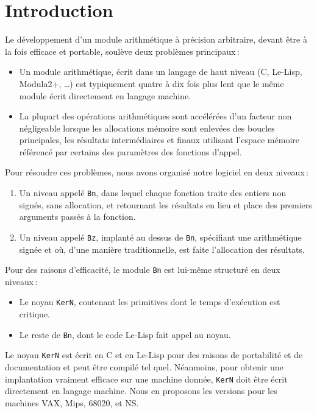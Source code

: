 \section{Introduction}
Le d\'eveloppement d'un module arithm\'etique \`a pr\'ecision arbitraire,
devant \^etre \`a la fois efficace et portable, soul\`eve deux probl\`emes
principaux\,:
\begin{itemize}
  \item Un module arithm\'etique, \'ecrit dans un langage de haut niveau
    (C, Le-Lisp, Modula2+, \ldots) est typiquement quatre \`a dix fois plus
    lent que le m\^eme module \'ecrit directement en langage machine.
  \item La plupart des op\'erations arithm\'etiques sont acc\'el\'er\'ees d'un
    facteur non n\'egligeable lorsque les allocations m\'emoire sont enlev\'ees
    des boucles principales, les r\'esultats interm\'ediaires et finaux
    utilisant l'espace m\'emoire r\'ef\'erenc\'e par certains des param\`etres des
    fonctions d'appel.
\end{itemize}
Pour r\'esoudre ces probl\`emes, nous avons organis\'e notre logiciel en deux
niveaux\,:
\begin{enumerate}
  \item Un niveau appel\'e \verb+Bn+, dans lequel chaque fonction traite des
    entiers non sign\'es, sans allocation, et retournant les r\'esultats en lieu
    et place des premiers arguments pass\'es \`a la fonction.
  \item Un niveau appel\'e \verb+Bz+, implant\'e au dessus de \verb+Bn+,
    sp\'ecifiant une arithm\'etique sign\'ee et o\`u, d'une mani\`ere
    traditionnelle, est faite l'allocation des r\'esultats.
\end{enumerate}
Pour des raisons d'efficacit\'e, le module \verb+Bn+ est lui-m\^eme
structur\'e en deux niveaux\,:
\begin{itemize}
  \item Le noyau \verb+KerN+, contenant les primitives dont le temps
    d'ex\'ecution est critique.
  \item Le reste de \verb+Bn+, dont le code Le-Lisp fait appel au noyau.
\end{itemize}
Le noyau \verb+KerN+ est \'ecrit en C et en Le-Lisp pour des raisons de
portabilit\'e et de documentation et peut \^etre compil\'e tel quel.
N\'eanmoins, pour obtenir une implantation vraiment efficace sur une machine
donn\'ee, \verb+KerN+ doit \^etre \'ecrit directement en langage machine.
Nous en proposons les versions pour les machines VAX, Mips, 68020, et NS.
